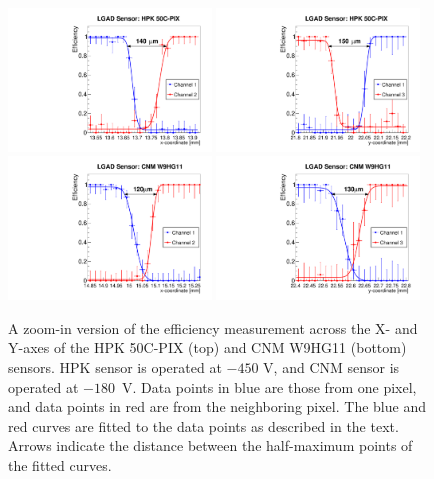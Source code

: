 \documentclass[preprint,1p]{elsarticle}
\begin{document}
\begin{figure}[!htbp] 
\centering
\includegraphics[width=0.48\textwidth]{figs/UCSCBoard_HPK50CPix_CNM_W9HG11_Runs838-839-841/Eff_vs_X_HPK50CPIX_Ch1_4_fit.pdf} 
\includegraphics[width=0.48\textwidth]{figs/UCSCBoard_HPK50CPix_CNM_W9HG11_Runs838-839-841/Eff_vs_Y_HPK50CPIX_Ch3_4_fit.pdf} 
\includegraphics[width=0.48\textwidth]{figs/UCSCBoard_HPK50CPix_CNM_W9HG11_Runs838-839-841/Eff_vs_X_CNM_Ch10_13_fit.pdf} 
\includegraphics[width=0.48\textwidth]{figs/UCSCBoard_HPK50CPix_CNM_W9HG11_Runs838-839-841/Eff_vs_Y_CNM_Ch13_12_fit.pdf} 
\caption{A zoom-in version of the efficiency measurement across the X- and Y-axes of the HPK 50C-PIX (top) and 
CNM W9HG11 (bottom) sensors. HPK sensor is operated at $-450$ V, and CNM sensor is operated at $-180$~V. Data points in blue are those from one pixel, and data points in red are from the neighboring pixel. 
The blue and red curves are fitted to the data points as described in the text. Arrows indicate the distance 
between the half-maximum points of the fitted curves.} 
\label{fig:UCSC_HPK50C_CNM_ZoomeffXY} 
\end{figure} 
\end{document}
